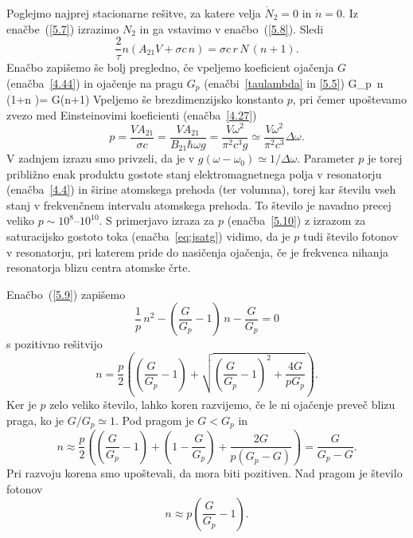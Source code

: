 Poglejmo najprej stacionarne rešitve, za katere velja $\dot{N}_{2}=0$ in 
$\dot{n}=0$. Iz enačbe~(\ref{5.7}) izrazimo $N_{2}$ in ga vstavimo v enačbo~(\ref{5.8}).
Sledi 
\begin{equation}
\frac{2}{\tau }n\left(A_{21}V+\sigma c\,n\right)=
\sigma c\, r\,N\,(n+1).
\label{5.9}
\end{equation}
Enačbo zapišemo še bolj pregledno, če vpeljemo koeficient ojačenja $G$ (enačba~\ref{4.44})
in ojačenje na pragu $G_p$ (enačbi~\ref{taulambda} in \ref{5.5})
\beq
G_p\, n\, \left(1+n \right)= G(n+1)
\eeq
Vpeljemo še brezdimenzijsko konstanto $p$, pri čemer upoštevamo zvezo
med Einsteinovimi koeficienti (enačba~\ref{4.27})
\begin{equation}
p=\frac{VA_{21}}{\sigma c} = 
\frac{VA_{21}}{B_{21}\hbar \omega g}=\frac{V\omega ^{2}}{\pi
^{2}c^{3}g}\simeq 
\frac{V\omega ^{2}}{\pi ^{2}c^{3}}\Delta \omega.  
\label{5.10}
\end{equation}
V zadnjem izrazu smo privzeli, da je v $g(\omega-\omega_0)\simeq
1/\Delta \omega $. Parameter $p$ je torej približno enak produktu 
gostote stanj elektromagnetnega polja v resonatorju (enačba~\ref{4.4}) 
in širine atomskega prehoda (ter volumna), torej kar številu vseh stanj 
v frekvenčnem intervalu atomskega prehoda. To število je navadno precej 
veliko $p \sim 10^{8}$--$10^{10}$. S primerjavo izraza za $p$ 
(enačba~\ref{5.10}) z izrazom za saturacijsko gostoto toka (enačba~\ref{eq:jsatg})
vidimo, da je $p$ tudi število fotonov v resonatorju, pri katerem pride 
do nasičenja ojačenja, če je frekvenca nihanja resonatorja blizu 
centra atomske črte. 

Enačbo~(\ref{5.9}) zapišemo 
\begin{equation}
\frac{1}{p}\,n^{2}-(\frac{G}{G_p}-1)\,n-\frac{G}{G_p}=0
\label{5.11}
\end{equation}
s pozitivno rešitvijo 
\begin{equation}
n=\frac{p}{2}\left( \left(\frac{G}{G_p}-1\right)+\sqrt{\left(\frac{G}{G_p}
-1\right)^{2}+ \frac{4G}{pG_p}}\right).
\label{5.12}
\end{equation}
Ker je $p$ zelo veliko število, lahko koren razvijemo, če le ni ojačenje
preveč blizu praga, ko je $G/G_p\simeq 1$. Pod pragom je $G<G_p$ 
in 
\begin{equation}
n\approx \frac{p}{2}\left( \left(\frac{G}{G_p}-1\right)+\left(1
-\frac{G}{G_p}\right)+\frac{2G}{p(G_p-G)}\right) =\frac{G}{G_p-G}.
\label{5.13}
\end{equation}
Pri razvoju korena smo upoštevali, da mora biti pozitiven. Nad pragom je
število fotonov 
\begin{equation}
n\approx p\left(\frac{G}{G_p}-1\right).
\label{5.14}
\end{equation}

